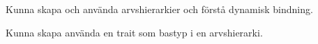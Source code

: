 

\item Kunna skapa och använda arvshierarkier och förstå dynamisk bindning.
\item Kunna skapa använda en trait som bastyp i en arvshierarki.

